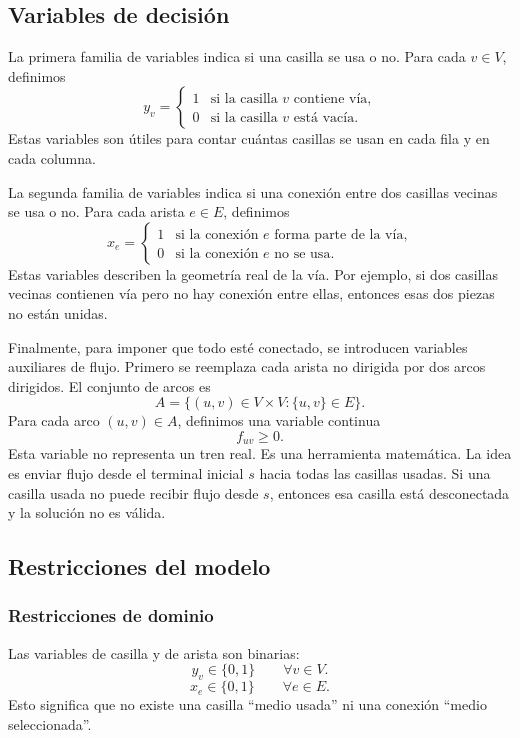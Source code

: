 \subsection{Variables de decisión}

La primera familia de variables indica si una casilla se usa o no. Para cada \(v \in V\), definimos
\[
    y_v =
    \begin{cases}
        1 & \text{si la casilla \(v\) contiene vía,}\\
        0 & \text{si la casilla \(v\) está vacía.}
    \end{cases}
\]
Estas variables son útiles para contar cuántas casillas se usan en cada fila y en cada columna.

La segunda familia de variables indica si una conexión entre dos casillas vecinas se usa o no. Para cada arista \(e \in E\), definimos
\[
    x_e =
    \begin{cases}
        1 & \text{si la conexión \(e\) forma parte de la vía,}\\
        0 & \text{si la conexión \(e\) no se usa.}
    \end{cases}
\]
Estas variables describen la geometría real de la vía. Por ejemplo, si dos casillas vecinas contienen vía pero no hay conexión entre ellas, entonces esas dos piezas no están unidas.

Finalmente, para imponer que todo esté conectado, se introducen variables auxiliares de flujo. Primero se reemplaza cada arista no dirigida por dos arcos dirigidos. El conjunto de arcos es
\[
    A = \{(u,v) \in V \times V : \{u,v\} \in E\}.
\]
Para cada arco \((u,v) \in A\), definimos una variable continua
\[
    f_{uv} \geq 0.
\]
Esta variable no representa un tren real. Es una herramienta matemática. La idea es enviar flujo desde el terminal inicial \(s\) hacia todas las casillas usadas. Si una casilla usada no puede recibir flujo desde \(s\), entonces esa casilla está desconectada y la solución no es válida.

\subsection{Restricciones del modelo}

\subsubsection{Restricciones de dominio}

Las variables de casilla y de arista son binarias:
\begin{equation}
    y_v \in \{0,1\}
    \qquad \forall v \in V.
    \label{eq:es-domain-y}
\end{equation}
\begin{equation}
    x_e \in \{0,1\}
    \qquad \forall e \in E.
    \label{eq:es-domain-x}
\end{equation}
Esto significa que no existe una casilla ``medio usada'' ni una conexión ``medio seleccionada''.

